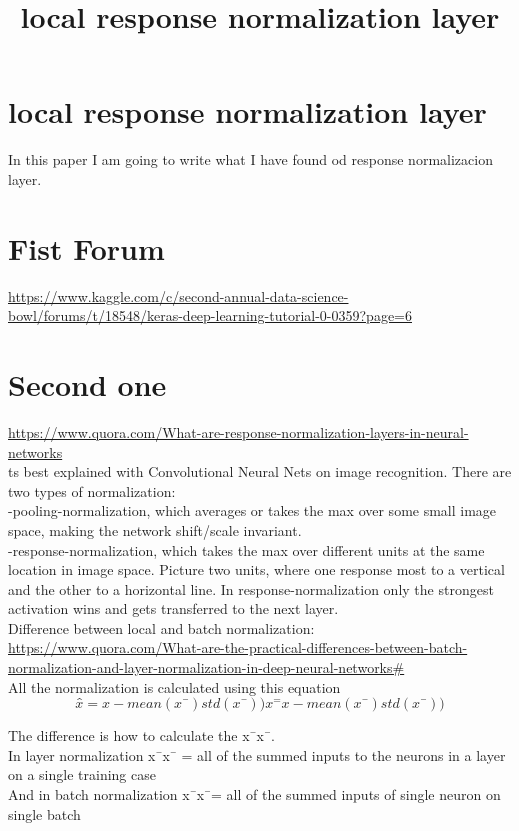 \documentclass[a4paper]{article}
\begin{document}
\title{local response normalization layer}
\maketitle

\section{local response normalization layer}
In this paper I am going to write what I have found od response normalizacion layer.

\section{Fist Forum}

\url{https://www.kaggle.com/c/second-annual-data-science-bowl/forums/t/18548/keras-deep-learning-tutorial-0-0359?page=6}

\section{Second one}
\url{https://www.quora.com/What-are-response-normalization-layers-in-neural-networks}\\

ts best explained with Convolutional Neural Nets on image recognition. There are two types of normalization:\\

-pooling-normalization, which averages or takes the max over some small image space, making the network shift/scale invariant.\\

-response-normalization, which takes the max over different units at the same location in image space. Picture two units, where one response most to a vertical and the other to a horizontal line. In response-normalization only the strongest activation wins and gets transferred to the next layer.\\

Difference between local and batch normalization: \\
\url{https://www.quora.com/What-are-the-practical-differences-between-batch-normalization-and-layer-normalization-in-deep-neural-networks#}\\

All the normalization is calculated using this equation\\

\begin{equation}
x̂ =x−mean(x¯)std(x¯))x^=x−mean(x¯)std(x¯))
\end{equation} 

The difference is how to calculate the x¯x¯.\\

In layer normalization x¯x¯ = all of the summed inputs to the neurons in a layer on a single training case\\

And in batch normalization x¯x¯= all of the summed inputs of single neuron on single batch\\
\end{document}

